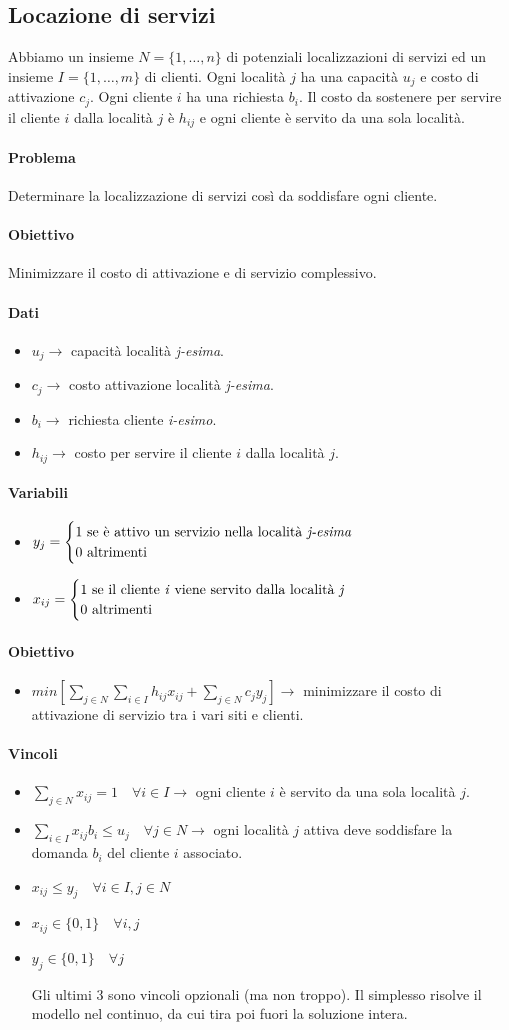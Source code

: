 \documentclass[12pt, twoside, letterpaper]{article}
\newcommand{\problemai}[5]{
	#1
	\begin{dati}
		\paragraph{Dati} 
			\begin{itemize}
				#2
			\end{itemize}
	\end{dati}
	\begin{variabili}
		\paragraph{Variabili} 
			\begin{itemize}
				#3
			\end{itemize}
	\end{variabili}
	\begin{obiettivo}
		\paragraph{Obiettivo} 
			\begin{itemize}
				#4
			\end{itemize}
	\end{obiettivo}
	\begin{vincoli}
		\paragraph{Vincoli}
			\begin{itemize}
				#5
			\end{itemize}
	\end{vincoli}
}
\begin{document}
			
		\subsection{Locazione di servizi}
			\problemai
			{
				Abbiamo un insieme $N = \{1, \dots, n\}$ di potenziali localizzazioni di servizi ed un insieme $I = \{1, \dots, m\}$ di clienti. Ogni località $j$ ha una capacità $u_j$ e costo di attivazione $c_j$. Ogni cliente $i$ ha una richiesta $b_i$. Il costo da sostenere per servire il cliente $i$ dalla località $j$ è $h_{ij}$ e ogni cliente è servito da una sola località.
				
				\paragraph{Problema} Determinare la localizzazione di servizi così da soddisfare ogni cliente.
				\paragraph{Obiettivo} Minimizzare il costo di attivazione e di servizio complessivo.
			}
			{
				\item $u_j \rightarrow$ capacità località \textit{j-esima}.
				\item $c_j \rightarrow$ costo attivazione località \textit{j-esima}.
				\item $b_i \rightarrow$ richiesta cliente \textit{i-esimo}.
				\item $h_{ij} \rightarrow$ costo per servire il cliente $i$ dalla località $j$.
			}
			{
				\item $y_j = \begin{cases} \text{1 se è attivo un servizio nella località \textit{j-esima}} \\ \text{0 altrimenti} \end{cases}$
				\item $x_{ij} = \begin{cases} \text{1 se il cliente \textit{i} viene servito dalla località \textit{j}} \\  \text{0 altrimenti} \end{cases}$
			}
			{
				\item $min [ \sum_{j \in N} \sum_{i \in I} h_{ij}x_{ij} + \sum_{j \in N} c_jy_j] \rightarrow$ minimizzare il costo di attivazione di servizio tra i vari siti e clienti.
			}
			{
				\item $\sum_{j \in N} x_{ij} = 1 \quad \forall i \in I \rightarrow$ ogni cliente $i$ è servito da una sola località $j$.
				\item $\sum_{i \in I} x_{ij} b_i \leq u_j \quad \forall j \in N \rightarrow$ ogni località $j$ attiva deve soddisfare la domanda $b_i$ del cliente $i$ associato.
				\item $x_{ij} \leq y_j \quad \forall i \in I, j \in N$
				\item $x_{ij} \in \{0,1\} \quad \forall i,j$
				\item $y_j \in \{0,1\} \quad \forall j$ 
				
				Gli ultimi 3 sono vincoli opzionali (ma non troppo). Il simplesso risolve il modello nel continuo, da cui tira poi fuori la soluzione intera.
			}
		
\end{document}
